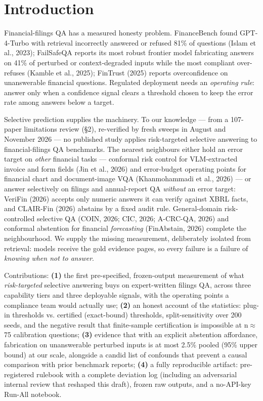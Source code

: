 \documentclass[11pt]{article}
\begin{document}
\section{Introduction}

Financial-filings QA has a measured honesty problem. FinanceBench found GPT-4-Turbo with retrieval incorrectly answered or refused 81\% of questions (Islam et al., 2023); FailSafeQA reports its most robust frontier model fabricating answers on 41\% of perturbed or context-degraded inputs while the most compliant over-refuses (Kamble et al., 2025); FinTrust (2025) reports overconfidence on unanswerable financial questions. Regulated deployment needs an \emph{operating rule}: answer only when a confidence signal clears a threshold chosen to keep the error rate among answers below a target.

Selective prediction supplies the machinery. To our knowledge --- from a 107-paper limitations review (\S{}2), re-verified by fresh sweeps in August and November 2026 --- no published study applies risk-targeted selective answering to financial-filings QA benchmarks. The nearest neighbours either hold an error target on \emph{other} financial tasks --- conformal risk control for VLM-extracted invoice and form fields (Jin et al., 2026) and error-budget operating points for financial chart and document-image VQA (Khanmohammadi et al., 2026) --- or answer selectively on filings and annual-report QA \emph{without} an error target: VeriFin (2026) accepts only numeric answers it can verify against XBRL facts, and CLAIR-Fin (2026) abstains by a fixed audit rule. General-domain risk-controlled selective QA (COIN, 2026; CIC, 2026; A-CRC-QA, 2026) and conformal abstention for financial \emph{forecasting} (FinAbstain, 2026) complete the neighbourhood. We supply the missing measurement, deliberately isolated from retrieval: models receive the gold evidence pages, so every failure is a failure of \emph{knowing when not to answer}.

Contributions: \textbf{(1)} the first pre-specified, frozen-output measurement of what \emph{risk-targeted} selective answering buys on expert-written filings QA, across three capability tiers and three deployable signals, with the operating points a compliance team would actually use; \textbf{(2)} an honest account of the statistics: plug-in thresholds vs. certified (exact-bound) thresholds, split-sensitivity over 200 seeds, and the negative result that finite-sample certification is impossible at n$\approx$75 calibration questions; \textbf{(3)} evidence that with an explicit abstention affordance, fabrication on unanswerable perturbed inputs is at most 2.5\% pooled (95\% upper bound) at our scale, alongside a candid list of confounds that prevent a causal comparison with prior benchmark reports; \textbf{(4)} a fully reproducible artifact: pre-registered rulebook with a complete deviation log (including an adversarial internal review that reshaped this draft), frozen raw outputs, and a no-API-key Run-All notebook.
\end{document}
